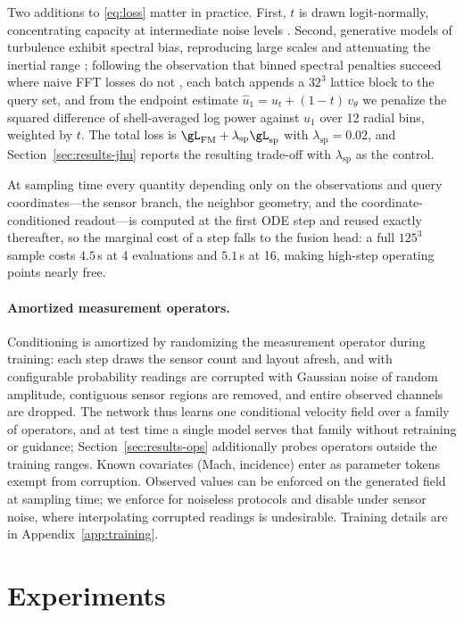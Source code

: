 \documentclass{article} %
\begin{document}
Two additions to \eqref{eq:loss} matter in practice. First, $t$ is drawn logit-normally, concentrating capacity at intermediate noise levels \citep{ma2024sit}. Second, generative models of turbulence exhibit spectral bias, reproducing large scales and attenuating the inertial range \citep{rahaman2019spectral}; following the observation that binned spectral penalties succeed where naive FFT losses do not \citep{chakraborty2026binned}, each batch appends a $32^3$ lattice block to the query set, and from the endpoint estimate $\hat{u}_1 = u_t + (1-t)\,v_\theta$ we penalize the squared difference of shell-averaged log power against $u_1$ over 12 radial bins, weighted by $t$. The total loss is $\gL_{\mathrm{FM}} + \lambda_{\mathrm{sp}}\gL_{\mathrm{sp}}$ with $\lambda_{\mathrm{sp}}=0.02$, and Section~\ref{sec:results-jhu} reports the resulting trade-off with $\lambda_{\mathrm{sp}}$ as the control.

At sampling time every quantity depending only on the observations and query coordinates---the sensor branch, the neighbor geometry, and the coordinate-conditioned readout---is computed at the first ODE step and reused exactly thereafter, so the marginal cost of a step falls to the fusion head: a full $125^3$ sample costs $4.5$\,s at 4 evaluations and $5.1$\,s at 16, making high-step operating points nearly free.

\paragraph{Amortized measurement operators.}
\label{sec:method-operators}
Conditioning is amortized by randomizing the measurement operator during training: each step draws the sensor count and layout afresh, and with configurable probability readings are corrupted with Gaussian noise of random amplitude, contiguous sensor regions are removed, and entire observed channels are dropped. The network thus learns one conditional velocity field over a family of operators, and at test time a single model serves that family without retraining or guidance; Section~\ref{sec:results-ops} additionally probes operators outside the training ranges. Known covariates (Mach, incidence) enter as parameter tokens exempt from corruption. Observed values can be enforced on the generated field at sampling time; we enforce for noiseless protocols and disable under sensor noise, where interpolating corrupted readings is undesirable. Training details are in Appendix~\ref{app:training}.

\section{Experiments}
\label{sec:results}
\end{document}
